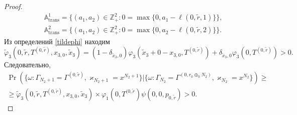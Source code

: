 \documentclass[a4paper,12pt,russian]{extarticle}
\begin{document}
\begin{proof}
\begin{align*}
&{\mathbb A}_{\mathrm{trans}}^1 = \{(a_1,a_2) \in \mathbb{Z}_+^2 \colon 0=\max{\{0,a_1-\ell(0,\tilde{r},1)\}}\},\\
 &{\mathbb A}_{\mathrm{trans}}^2= \{(a_1,a_2) \in \mathbb{Z}_+^2 \colon  0=\max{\{0,a_2-\ell(0,\tilde{r},2)\}}\}.
\end{align*}
Из определений \eqref{tildephi} находим
\begin{equation*}
\widetilde{\varphi}_3(0,\tilde{r},T^{(0,\tilde{r})},x_{3,0},\tilde{x}_3)= (1-\delta_{\tilde{x}_3,0}) \varphi_3(\tilde{x}_3 + 0 - x_{3,0},T^{(0,\tilde{r})} ) + \delta_{\tilde{x}_3,0} \varphi_3(0,T^{(0,\tilde{r})}) > 0.
\end{equation*}
Следовательно, 
\begin{multline*}
\Pr (\{\omega\colon\Gamma_{N_2+1}=\Gamma^{(0,\tilde{r})},\varkappa_{N_2+1}=x^{N_2+1} \}| \{\omega\colon\Gamma_{N_2}=\Gamma^{(0,r_0\oplus_{0}N_2)},\varkappa_{N_2}=x^{N_2}\})\geqslant\\
\geqslant \widetilde{\varphi}_3(0,\tilde{r},T^{(0,\tilde{r})},x_{3,0},\tilde{x}_3)
\times
\varphi_1(0,T^{(0,\tilde{r}}) \psi(0,0, p_{0,\tilde{r}}) > 0.
\end{multline*}


\end{proof}
\end{document}
